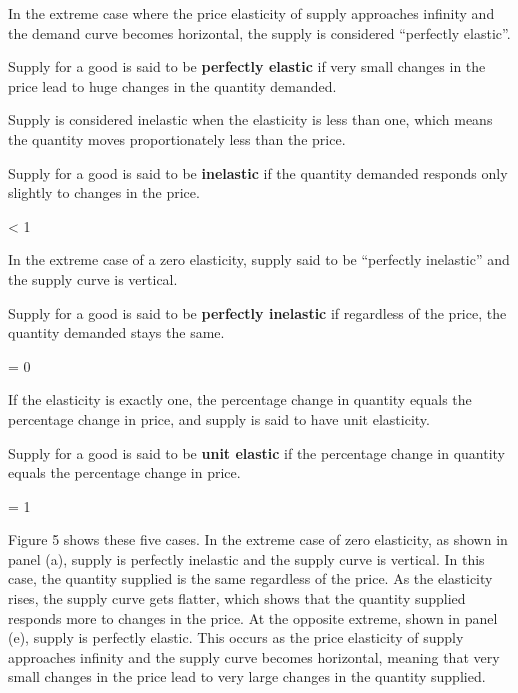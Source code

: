 In the extreme case where the price elasticity of supply approaches infinity and the demand curve becomes horizontal,
the supply is considered ``perfectly elastic''.

Supply for a good is said to be \textbf{perfectly elastic} if very small changes in the price lead to huge changes in
the quantity demanded.

\bse
{} \to \infty
\ese
\ed

Supply is considered inelastic when the elasticity is less than one, which means the quantity moves proportionately
less than the price.

Supply for a good is said to be \textbf{inelastic} if the quantity demanded responds only slightly to changes in the
price.

\bse
{} < 1
\ese
\ed

In the extreme case of a zero elasticity, supply said to be ``perfectly inelastic'' and the supply curve is vertical.

Supply for a good is said to be \textbf{perfectly inelastic} if regardless of the price, the quantity demanded stays the
same.

\bse
{} = 0
\ese
\ed

If the elasticity is exactly one, the percentage change in quantity equals the percentage change in price, and supply
is said to have unit elasticity.

Supply for a good is said to be \textbf{unit elastic} if the percentage change in quantity equals the percentage change
in price.

\bse
{} = 1
\ese
\ed

Figure 5 shows these five cases. In the extreme case of zero elasticity, as shown in panel (a), supply is perfectly
inelastic and the supply curve is vertical. In this case, the quantity supplied is the same regardless of the price.
As the elasticity rises, the supply curve gets flatter, which shows that the quantity supplied responds more to
changes in the price. At the opposite extreme, shown in panel (e), supply is perfectly elastic. This occurs as the
price elasticity of supply approaches infinity and the supply curve becomes horizontal, meaning that very small
changes in the price lead to very large changes in the quantity supplied.



